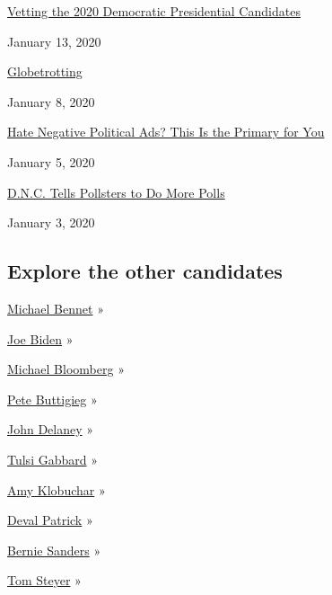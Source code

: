 \href{https://www.nytimes.com/2020/01/13/the-weekly/democratic-endorsement-2020.html}{Vetting
the 2020 Democratic Presidential Candidates}

January 13, 2020

\href{https://www.nytimes.com/interactive/2020/01/08/books/new-books-international.html}{Globetrotting}

January 8, 2020

\href{https://www.nytimes.com/2020/01/05/us/politics/democratic-ads-2020-negative.html}{Hate
Negative Political Ads? This Is the Primary for You}

January 5, 2020

\href{https://www.nytimes.com/2020/01/03/us/politics/dnc-debate-polls.html}{D.N.C.
Tells Pollsters to Do More Polls}

January 3, 2020

\hypertarget{explore-the-other-candidates}{%
\subsection{Explore the other
candidates}\label{explore-the-other-candidates}}

\href{https://www.nytimes.com/interactive/2020/us/elections/michael-bennet.html}{Michael
Bennet} »

\href{https://www.nytimes.com/interactive/2020/us/elections/joe-biden.html}{Joe
Biden} »

\href{https://www.nytimes.com/interactive/2020/us/elections/michael-bloomberg.html}{Michael
Bloomberg} »

\href{https://www.nytimes.com/interactive/2020/us/elections/pete-buttigieg.html}{Pete
Buttigieg} »

\href{https://www.nytimes.com/interactive/2020/us/elections/john-delaney.html}{John
Delaney} »

\href{https://www.nytimes.com/interactive/2020/us/elections/tulsi-gabbard.html}{Tulsi
Gabbard} »

\href{https://www.nytimes.com/interactive/2020/us/elections/amy-klobuchar.html}{Amy
Klobuchar} »

\href{https://www.nytimes.com/interactive/2020/us/elections/deval-patrick.html}{Deval
Patrick} »

\href{https://www.nytimes.com/interactive/2020/us/elections/bernie-sanders.html}{Bernie
Sanders} »

\href{https://www.nytimes.com/interactive/2020/us/elections/tom-steyer.html}{Tom
Steyer} »

